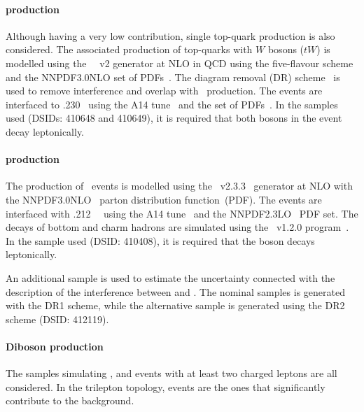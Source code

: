 \paragraph{\tW production} 
Although having a very low contribution, single top-quark production is also considered.
The associated production of top-quarks with $W$ bosons ($tW$) is
modelled using the
\powhegbox~\cite{Re:2010bp,Nason:2004rx,Frixione:2007vw,Alioli:2010xd}~v2
generator at NLO in QCD using the five-flavour scheme and the
NNPDF3.0NLO set of PDFs~\cite{Ball:2014uwa}.
The diagram removal (DR) scheme~\cite{Frixione:2008yi} is used to
remove interference and overlap with \ttbar\ production. 
The events are interfaced to \pythia.230~\cite{Sjostrand:2014zea} using the A14
tune~\cite{ATL-PHYS-PUB-2014-021} and the \nnpdftwo set of
PDFs~\cite{Ball:2012cx}.
In the samples used (DSIDs: 410648 and 410649), it is required that both \PW bosons in the event decay leptonically. 

\paragraph{\tWZ production} 
The production of \tWZ\ events is modelled using the \mgamc~v2.3.3~\cite{Alwall:2014hca}
generator at NLO with the NNPDF3.0NLO~\cite{Ball:2014uwa} parton distribution function~(PDF).
The events are interfaced with \pythia.212~\cite{Sjostrand:2014zea}~ using the A14 tune~\cite{ATL-PHYS-PUB-2014-021} and the NNPDF2.3LO~\cite{Ball:2014uwa} PDF set.
The decays of bottom and charm hadrons are simulated using the \evtgen\ v1.2.0 program~\cite{EvtGen}. 
In the sample used (DSID\@: 410408), it is required that the \PZ boson decays leptonically. 

An additional \tWZ sample is used to estimate the uncertainty connected with the description of the interference between \ttZ and \tWZ. The nominal samples is generated with the DR1 scheme, while the alternative sample is generated using the DR2 scheme (DSID\@: 412119).

\paragraph{Diboson production} 
The samples simulating \PW{}\PW, \PW{}\PZ and \PZ{}\PZ events with at least two charged leptons are all considered.
In the trilepton topology, \PW{}\PZ events are the ones that significantly contribute to the background.

